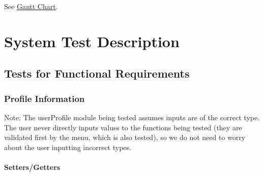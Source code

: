 \documentclass[12pt, titlepage]{article}
\makeatletter
\def\itemlabel#1#2{\def\@currentlabel{#2}\phantomsection\label{#1}}
\makeatother
\begin{document}
See \href{https://gitlab.cas.mcmaster.ca/jamesong/application_3xa3_l01_grp05/-/blob/main/ProjectSchedule/3XA3_Gantt.png}{Gantt Chart}.

\section{System Test Description}
	
\subsection{Tests for Functional Requirements} \label{sec:funcreq}

\subsubsection{Profile Information}

Note: The userProfile module being tested assumes inputs are of the correct type. The user never directly inputs values to the functions being tested (they are validated first by the menu, which is also tested), so we do not need to worry about the user inputting incorrect types.

\paragraph{Setters/Getters} \itemlabel{para:PS}{PS Tests} %
\end{document}
